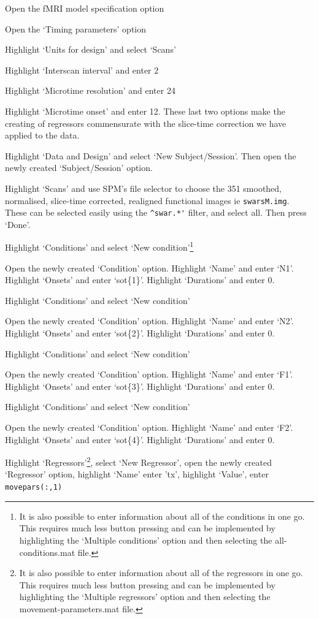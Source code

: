 \bi
\item{Open the fMRI model specification option}
\item{Open the `Timing parameters' option}
\item{Highlight `Units for design' and select `Scans'}
\item{Highlight `Interscan interval' and enter 2}
\item{Highlight `Microtime resolution' and enter 24}
\item{Highlight `Microtime onset' and enter 12. These last two options make the creating of regressors commensurate with the slice-time correction we have applied to the data.}
\item{Highlight `Data and Design' and select `New Subject/Session'. Then open the newly created `Subject/Session' option.}
\item{Highlight `Scans' and use SPM's file selector to choose the 351 smoothed, normalised, slice-time corrected, realigned functional images ie  \verb!swarsM.img!. These can be selected easily using the \verb!^swar.*'! filter, and select all. Then press `Done'.}
\item{Highlight `Conditions' and select `New condition'\footnote{It is also possible to enter information about all of the conditions in one go. This requires much less button pressing and can be implemented by highlighting the `Multiple conditions' option and then selecting the {\sf all-conditions.mat} file.}}
\item{Open the newly created `Condition' option. Highlight `Name' and enter `N1'. Highlight `Onsets' and enter `sot\{1\}'. Highlight `Durations' and enter 0.}
\item{Highlight `Conditions' and select `New condition'}
\item{Open the newly created `Condition' option. Highlight `Name' and enter `N2'. Highlight `Onsets' and enter `sot\{2\}'. Highlight `Durations' and enter 0.}
\item{Highlight `Conditions' and select `New condition'}
\item{Open the newly created `Condition' option. Highlight `Name' and enter `F1'. Highlight `Onsets' and enter `sot\{3\}'. Highlight `Durations' and enter 0.}
\item{Highlight `Conditions' and select `New condition'}
\item{Open the newly created `Condition' option. Highlight `Name' and enter `F2'. Highlight `Onsets' and enter `sot\{4\}'. Highlight `Durations' and enter 0.}
\item{Highlight `Regressors'\footnote{It is also possible to enter information about all of the regressors in one go. This requires much less button pressing and can be implemented by highlighting the `Multiple regressors' option and then selecting the {\sf movement-parameters.mat} file.}, select `New Regressor', open the newly created `Regressor' option, highlight `Name' enter 'tx', highlight `Value', enter \verb!movepars(:,1)!}
